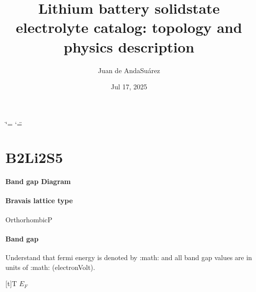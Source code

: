\documentclass[letterpaper,10pt,english]{sphinxmanual}
\title{Lithium battery solid\sphinxhyphen{}state electrolyte catalog: topology and physics description}
\date{Jul 17, 2025}
\author{Juan de Anda\sphinxhyphen{}Suárez}
\begin{document}
\ifdefined\shorthandoff
  \ifnum\catcode`\=\string=\active\shorthandoff{=}\fi
  \ifnum\catcode`\"=\active{}\fi
\fi

\pagestyle{empty}
\sphinxmaketitle
\pagestyle{plain}
\sphinxtableofcontents
\pagestyle{normal}
\label{\detokenize{index::doc}}


\sphinxstepscope


\chapter{B2Li2S5}
\label{\detokenize{B2Li2S5/B2Li2S5:b2li2s5}}\label{\detokenize{B2Li2S5/B2Li2S5::doc}}\subsubsection*{Band gap Diagram}

\noindent{}
\subsubsection*{Bravais lattice type}

\sphinxAtStartPar
OrthorhombicP
\subsubsection*{Band gap}

\sphinxAtStartPar
Understand that fermi energy is denoted by :math: and all band gap values are in units of :math: (electron\sphinxhyphen{}Volt).


\begin{savenotes}\sphinxattablestart
\sphinxthistablewithglobalstyle
\centering
\begin{tabulary}{\linewidth}[t]{T}
\sphinxtoprule
\sphinxstyletheadfamily 
\sphinxAtStartPar
\(E_F\)
\\
\sphinxmidrule
\sphinxtableatstartofbodyhook
{}
\\
\sphinxbottomrule
\end{tabulary}
\sphinxtableafterendhook\par
\sphinxattableend\end{savenotes}
\end{document}
